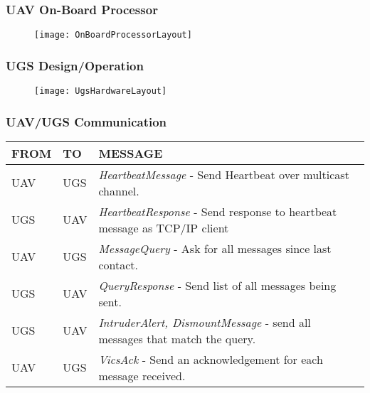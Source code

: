 \documentclass{beamer}
\begin{document}
\begin{frame}\frametitle{UAV On-Board Processor} 
\begin{figure}
\centering
      \texttt{[image: OnBoardProcessorLayout]}
      \label{fig:OnBoardProcessorLayout}
\end{figure}
\end{frame}
\begin{frame}\frametitle{UGS Design/Operation} 
\begin{figure}
\centering
      \texttt{[image: UgsHardwareLayout]}
      \label{fig:UgsHardwareLayout}
\end{figure}
\end{frame}
\begin{frame}\frametitle{UAV/UGS Communication} 
\begin{table}
\begin{flushleft}
\begin{tabular}{|m{1.0cm}|m{1.0cm}|m{8.25cm}|}\hline
 \textbf{FROM}  & \textbf{TO}     & \textbf{MESSAGE}\\ \hline \hline
UAV & UGS & \emph{HeartbeatMessage} - Send Heartbeat over multicast channel.\\ \hline
UGS & UAV & \emph{HeartbeatResponse} - Send response to heartbeat message as TCP/IP client\\ \hline
UAV & UGS & \emph{MessageQuery} - Ask for all messages since last contact.\\ \hline
UGS & UAV & \emph{QueryResponse} - Send list of all messages being sent.\\ \hline
UGS & UAV & \emph{IntruderAlert, DismountMessage} - send all messages that match the query.\\ \hline
UAV & UGS & \emph{VicsAck} - Send an acknowledgement for each message received.\\ \hline
\end{tabular}
\end{flushleft}
\end{table}
\end{frame}
\end{document}

